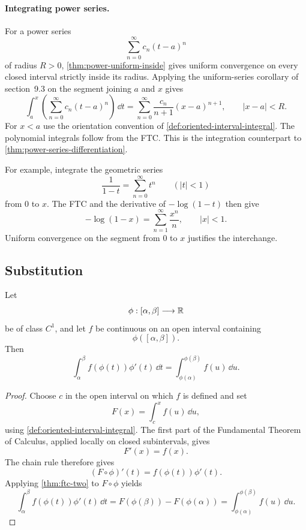 \paragraph{Integrating power series.}
For a power series
\[
\sum_{n=0}^{\infty}c_n(t-a)^n
\]
of radius $R>0$,
\cref{thm:power-uniform-inside} gives uniform convergence on every closed
interval strictly inside its radius. Applying the uniform-series corollary of section~9.3 on the segment
joining $a$ and $x$ gives
\[
\int_a^x\left(\sum_{n=0}^{\infty}c_n(t-a)^n\right)\,\dd t
=\sum_{n=0}^{\infty}\frac{c_n}{n+1}(x-a)^{n+1},
\qquad |x-a|<R.
\]
For $x<a$ use the orientation convention of
\cref{def:oriented-interval-integral}. The polynomial integrals follow from the FTC. This is the integration counterpart to
\cref{thm:power-series-differentiation}.

For example, integrate the geometric series
\[
\frac{1}{1-t}=\sum_{n=0}^{\infty}t^n\qquad(|t|<1)
\]
from $0$ to $x$. The FTC and the derivative of $-\log(1-t)$ then give
\[
-\log(1-x)=\sum_{n=1}^{\infty}\frac{x^n}{n},\qquad |x|<1.
\]
Uniform convergence on the segment from $0$ to $x$ justifies the interchange.

\subsection{Substitution}

\begin{theorem}[Substitution]
\label{thm:one-variable-substitution}
Let
\[
\phi:[\alpha,\beta]\longrightarrow\mathbb{R}
\]
be of class \(C^1\), and let \(f\) be continuous on an open interval
containing
\[
\phi([\alpha,\beta]).
\]
Then
\[
\int_\alpha^\beta f(\phi(t))\phi'(t)\,\dd t
=
\int_{\phi(\alpha)}^{\phi(\beta)}f(u)\,\dd u.
\]
\end{theorem}
\begin{proof}
Choose \(c\) in the open interval on which \(f\) is defined and set
\[
F(x)=\int_c^x f(u)\,\dd u,
\]
using \cref{def:oriented-interval-integral}.  The first part of the
Fundamental Theorem of Calculus, applied locally on closed subintervals,
gives
\[
F'(x)=f(x).
\]
The chain rule therefore gives
\[
(F\circ\phi)'(t)=f(\phi(t))\phi'(t).
\]
Applying \cref{thm:ftc-two} to \(F\circ\phi\) yields
\[
\int_\alpha^\beta f(\phi(t))\phi'(t)\,\dd t
=
F(\phi(\beta))-F(\phi(\alpha))
=
\int_{\phi(\alpha)}^{\phi(\beta)}f(u)\,\dd u.
\]
\end{proof}

